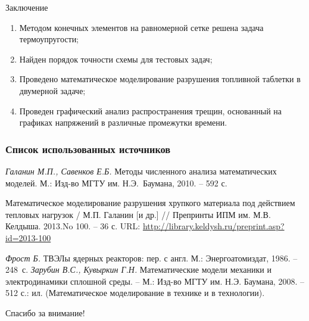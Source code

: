 \documentclass{beamer}
\begin{document}
	
	\begin{frame}{Заключение}
		\large
		\begin{enumerate}
			\item Методом конечных элементов на равномерной сетке решена задача термоупругости;
			\item Найден порядок точности схемы для тестовых задач;
			\item Проведено математическое моделирование разрушения топливной таблетки в двумерной задаче;
			\item Проведен графический анализ распространения трещин, основанный на графиках напряжений в различные промежутки времени.
		\end{enumerate}
	\end{frame}
	
	
	\begin{frame}
		\frametitle{Список использованных источников}
		\begin{thebibliography}{9}
			
			 \textit{Галанин М.П., Савенков Е.Б.} Методы численного анализа математических моделей. М.: Изд-во МГТУ им. \mbox{Н.Э. Баумана},	2010. -- 592 с.
			
			 Математическое моделирование разрушения хрупкого материала под действием тепловых нагрузок / М.П. Галанин [и др.] // Препринты ИПМ им. М.В. Келдыша. 2013.No 100. -- 36 с. URL: \url{http://library.keldysh.ru/preprint.asp?id=2013-100}
			
			 \textit{Фрост Б.} ТВЭЛы ядерных реакторов: пер. с англ. М.: Энергоатомиздат, 1986. --
			\mbox{248 с.}
			 \textit{Зарубин В.С., Кувыркин Г.Н.} Математические модели механики и электродинамики сплошной среды. -- М.: Изд-во МГТУ им. Н.Э. Баумана, 2008. -- 512 с.: ил. (Математическое моделирование в технике и в технологии).
			
		\end{thebibliography}
	\end{frame}
	
	\begin{frame}
		\LARGE
		\centering
		Спасибо за внимание!
	\end{frame}
	
	
	
\end{document}
